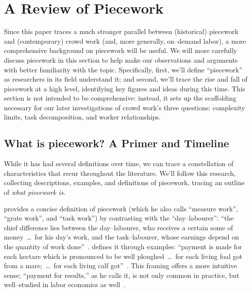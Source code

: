 \documentclass[trackingWork]{subfiles}
\begin{document}
\section{A Review of Piecework}

Since this paper traces a much stronger parallel between
(historical) piecework and (contemporary) crowd work
(and, more generally, on--demand labor),
a more comprehensive background on piecework will be useful.
We will more carefully discuss piecework in this section
to help make our observations and arguments with better familiarity with the topic.
Specifically,
first, we'll define ``piecework'' as researchers in its field understand it;
and second, we'll trace the rise and fall of piecework at a high level,
identifying key figures and ideas during this time.
This section is not intended to be comprehensive:
instead, it sets up the scaffolding necessary for
our later investigations of crowd work's three questions:
complexity limits,
task decomposition, and
worker relationships.

\subsection{What is piecework? A Primer and Timeline}\label{sec:whatIsPiecework}
While it has had several definitions over time,
we can trace a constellation of characteristics that recur throughout the literature.
We'll follow this research, collecting
descriptions,
examples, and
definitions of piecework,
tracing an outline of %
\textit{what piecework is}.

\citeauthor{hughRaynbirdTaskWork} provides
a concise definition of piecework
(which he also calls ``measure work'', ``grate work'', and ``task work'')
by contrasting with the ``day--labourer'':
``the chief difference lies between the day--labourer,
who receives a certain some of money~\dots~for his day's work,
and the task--labourer, whose earnings depend on the quantity of work done''~\cite{hughRaynbirdTaskWork}.
\citeauthor{10.2307/2338394} defines it through examples:
``payment is made for each hectare which is pronounced to be well ploughed~\dots~for each living foal got from a mare;~\dots~for each living calf got''~\cite{10.2307/2338394}.
This framing offers a more intuitive sense;
``payment for results,'' as he calls it,
is not only common in practice, but
well--studied in labor economics as well~\cite{Figlio2007901,weitzman1976new,10.2307/3003414,BJIR:BJIR038}.
\end{document}
